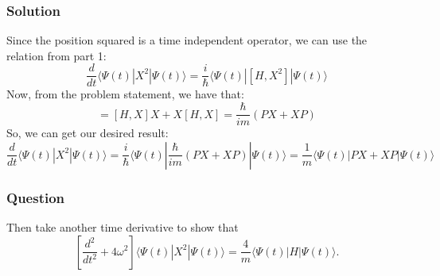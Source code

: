\documentclass[12pt]{article}
\begin{document}
\subsubsection{Solution}
Since the position squared is a time independent operator, we can use the relation from part 1:
\begin{equation}
    \frac{d}{dt} \langle \Psi(t)|X^2|\Psi(t)\rangle = \frac{i}{\hbar} \langle \Psi(t)|[H, X^2]|\Psi(t)\rangle
\end{equation}
Now, from the problem statement, we have that:
\begin{equation}
    [H, X^2] = [H, X]X + X[H, X] = \frac{\hbar}{im}\left(P X + XP\right)
\end{equation}
So, we can get our desired result:
\begin{equation}
    \frac{d}{dt} \langle \Psi(t)|X^2|\Psi(t)\rangle = \frac{i}{\hbar} \langle \Psi(t)| \frac{\hbar}{im}\left(P X + XP\right) |\Psi(t)\rangle = \boxed{\frac{1}{m} \langle \Psi(t)|PX + XP|\Psi(t)\rangle}
\end{equation}
\subsubsection{Question}
Then take another time derivative to show that
\[
\left[ \frac{d^2}{dt^2} + 4\omega^2 \right]\langle \Psi(t)|X^2|\Psi(t)\rangle = \frac{4}{m} \langle \Psi(t)|H|\Psi(t)\rangle.
\]
\end{document}
